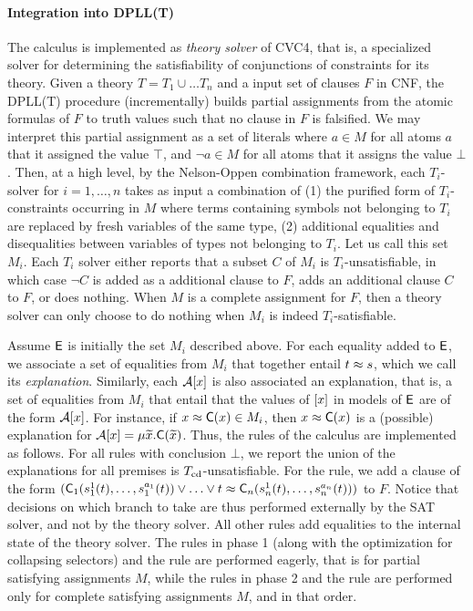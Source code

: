 \paragraph{Integration into DPLL(T)}
The calculus is implemented as \emph{theory solver} of CVC4,
that is, a specialized solver for determining the satisfiability of conjunctions of constraints for its theory.
Given a theory $T = T_1 \cup \ldots T_n$ and a input set of clauses $F$ in CNF,
the DPLL(T)  procedure
(incrementally) builds partial assignments from the atomic formulas of $F$ to truth values such that no clause in $F$ is falsified.
We may interpret this partial assignment as a set of literals where $a \in M$ for all atoms $a$ that it assigned the value $\top$, and $\neg a \in M$ for all atoms that it assigns the value $\bot$.
Then, at a high level, by the Nelson-Oppen combination framework,
each $T_i$-solver for $i = 1, \ldots, n$ takes as input a combination of (1) the purified form of $T_i$-constraints occurring in $M$ where terms containing symbols not belonging to $T_i$ are replaced by fresh variables of the same type, 
(2) additional equalities and disequalities between variables of types not belonging to $T_i$.
Let us call this set $M_i$.
Each $T_i$ solver either 
reports that a subset $C$ of $M_i$ is $T_i$-unsatisfiable, in which case $\neg C$ is added as a additional clause to $F$,
adds an additional clause $C$ to $F$,
or does nothing.
When $M$ is a complete assignment for $F$, then a theory solver can only choose to do nothing when $M_i$ is indeed $T_i$-satisfiable.

Assume $\mathsf{E}$ is initially the set $M_i$ described above.
For each equality added to $\mathsf{E}$, we associate a set of equalities from $M_i$ that together entail $t \approx s$,
which we call its \emph{explanation}.
Similarly, each $\mathcal{A} [x]$ is also associated an explanation, that is, 
a set of equalities from $M_i$ that entail that the values of $[x]$ in models of $\mathsf{E}$ are of the form $\mathcal{A} [x]$.
For instance, if $x \approx \textsf{C}( x ) \in M_i$, then $x \approx \textsf{C}( x )$ is a (possible) explanation for $\mathcal{A} [x] = \mu {\widetilde{x}}. \textsf{C}( {\widetilde{x}} )$.
Thus, the rules of the calculus are implemented as follows.
For all rules with conclusion $\bot$,
we report the union of the explanations for all premises is $T_{\mathrm{cd}}$-unsatisfiable.
For the  rule, we add a clause of the form
$(\textsf{C}_1( s^1_1( t ), \ldots, s^{a_1}_1( t ) ) \vee \ldots \vee t \approx \textsf{C}_n( s^1_n( t ), \ldots, s^{a_n}_n( t ) ))$
to $F$.
Notice that decisions on which branch to take are thus performed externally by the SAT solver, and not by the theory solver.
All other rules add equalities to the internal state of the theory solver.
The rules in phase 1 (along with the optimization for collapsing selectors) and the  rule are performed eagerly, 
that is for partial satisfying assignments $M$, while the rules in phase 2 and the  rule are performed only for complete satisfying assignments $M$, 
and in that order.

